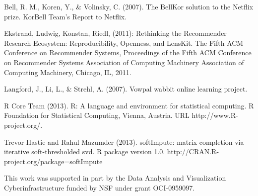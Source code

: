 \documentclass[oneside]{article}
\begin{document}
\begin{thebibliography}{1}
  \bibitem{}Bell, R. M., Koren, Y., \& Volinsky, C. (2007). The BellKor solution to the Netflix prize. KorBell Team’s Report to Netflix.

  \bibitem{}Ekstrand, Ludwig, Konstan, Riedl, (2011): Rethinking the Recommender Research Ecosystem: Reproducibility, Openness, and LensKit. The Fifth ACM Conference on Recommender Systems, Proceedings of the Fifth ACM Conference on Recommender Systems Association of Computing Machinery Association of Computing Machinery, Chicago, IL, 2011.

  \bibitem{}Langford, J., Li, L., \& Strehl, A. (2007). Vowpal wabbit online learning project.

  \bibitem{}R Core Team (2013). R: A language and environment for statistical
  computing. R Foundation for Statistical Computing, Vienna, Austria.
  URL http://www.R-project.org/.

  \bibitem{}Trevor Hastie and Rahul Mazumder (2013). softImpute: matrix
  completion via iterative soft-thresholded svd. R package version 1.0.
  http://CRAN.R-project.org/package=softImpute

  \bibitem{}This work was supported in part by the Data Analysis and Visualization Cyberinfrastructure funded by NSF under grant OCI-0959097.

\end{thebibliography}
\end{document}
